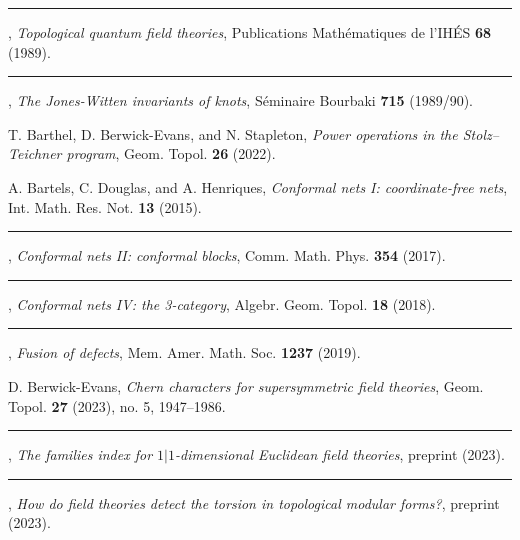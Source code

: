 \begin{description}[leftmargin=5.6em,labelwidth=5.2em,labelsep=0.4em,itemsep=0.5ex,parsep=0pt,topsep=0.8ex]
\item[\textbf{[Ati89]}] \rule[0.45ex]{2.6em}{0.45pt}, \textit{Topological quantum field theories}, Publications Math\'ematiques de l'IH\'ES \textbf{68} (1989).
\item[\textbf{[Ati90]}] \rule[0.45ex]{2.6em}{0.45pt}, \textit{The Jones-Witten invariants of knots}, S\'eminaire Bourbaki \textbf{715} (1989/90).
\item[\textbf{[BBES22]}] T. Barthel, D. Berwick-Evans, and N. Stapleton, \textit{Power operations in the Stolz--Teichner program}, Geom. Topol. \textbf{26} (2022).
\item[\textbf{[BDH15]}] A. Bartels, C. Douglas, and A. Henriques, \textit{Conformal nets I: coordinate-free nets}, Int. Math. Res. Not. \textbf{13} (2015).
\item[\textbf{[BDH17]}] \rule[0.45ex]{2.6em}{0.45pt}, \textit{Conformal nets II: conformal blocks}, Comm. Math. Phys. \textbf{354} (2017).
\item[\textbf{[BDH18]}] \rule[0.45ex]{2.6em}{0.45pt}, \textit{Conformal nets IV: the 3-category}, Algebr. Geom. Topol. \textbf{18} (2018).
\item[\textbf{[BDH19]}] \rule[0.45ex]{2.6em}{0.45pt}, \textit{Fusion of defects}, Mem. Amer. Math. Soc. \textbf{1237} (2019).
\item[\textbf{[BE23a]}] D. Berwick-Evans, \textit{Chern characters for supersymmetric field theories}, Geom. Topol. \textbf{27} (2023), no. 5, 1947--1986.
\item[\textbf{[BE23b]}] \rule[0.45ex]{2.6em}{0.45pt}, \textit{The families index for $1|1$-dimensional Euclidean field theories}, preprint (2023).
\item[\textbf{[BE23c]}] \rule[0.45ex]{2.6em}{0.45pt}, \textit{How do field theories detect the torsion in topological modular forms?}, preprint (2023).


\end{description}

